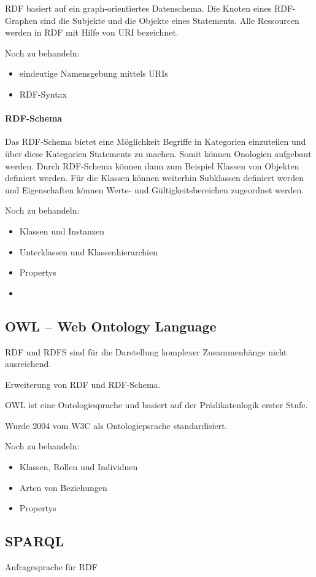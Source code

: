 \ac{RDF} basiert auf ein graph-orientiertes Datenschema.
Die Knoten eines RDF-Graphen sind die Subjekte und die Objekte eines Statements.
Alle Ressourcen werden in RDF mit Hilfe von \ac{URI} bezeichnet.

Noch zu behandeln:
\begin{itemize}
	\item eindeutige Namensgebung mittels URIs
	\item RDF-Syntax
\end{itemize}

\paragraph{RDF-Schema} 

Das RDF-Schema bietet eine Möglichkeit Begriffe in Kategorien einzuteilen und über diese Kategorien Statements zu machen.
Somit können Onologien aufgebaut werden.
Durch RDF-Schema können dann zum Beispiel Klassen von Objekten definiert werden.
Für die Klassen können weiterhin Subklassen definiert werden und Eigenschaften können Werte- und Gültigkeitsbereichen zugeordnet werden. \citep[vgl.]{pellegrinix}

Noch zu behandeln:
\begin{itemize}
	\item Klassen und Instanzen
	\item Unterklassen und Klassenhierarchien
	\item Propertys
	\item 
\end{itemize}

\subsection{OWL -- Web Ontology Language}

RDF und RDFS sind für die Darstellung komplexer Zusammenhänge nicht ausreichend.

Erweiterung von RDF und RDF-Schema. 

OWL ist eine Ontologiesprache und basiert auf der Prädikatenlogik erster Stufe.

Wurde 2004 vom W3C als Ontologiepsrache standardisiert.

Noch zu behandeln:
\begin{itemize}
	\item Klassen, Rollen und Individuen
	\item Arten von Beziehungen
	\item Propertys
\end{itemize}

\subsection{SPARQL} 

Anfragesprache für RDF


